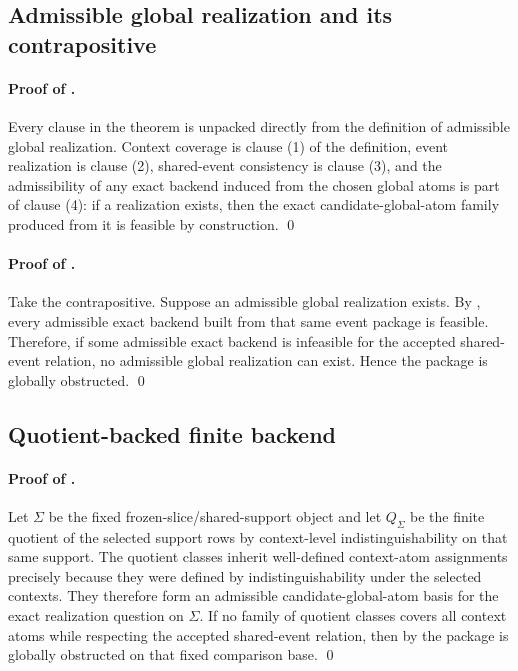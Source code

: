 \documentclass[11pt]{article}
\theoremstyle{definition}
\begin{document}
\subsection{Admissible global realization and its contrapositive}

\paragraph{Proof of .}
Every clause in the theorem is unpacked directly from the definition of admissible global realization. Context coverage is clause (1) of the definition, event realization is clause (2), shared-event consistency is clause (3), and the admissibility of any exact backend induced from the chosen global atoms is part of clause (4): if a realization exists, then the exact candidate-global-atom family produced from it is feasible by construction. \qed

\paragraph{Proof of .}
Take the contrapositive. Suppose an admissible global realization exists. By , every admissible exact backend built from that same event package is feasible. Therefore, if some admissible exact backend is infeasible for the accepted shared-event relation, no admissible global realization can exist. Hence the package is globally obstructed. \qed

\subsection{Quotient-backed finite backend}

\paragraph{Proof of .}
Let \(\Sigma\) be the fixed frozen-slice/shared-support object and let \(Q_\Sigma\) be the finite quotient of the selected support rows by context-level indistinguishability on that same support. The quotient classes inherit well-defined context-atom assignments precisely because they were defined by indistinguishability under the selected contexts. They therefore form an admissible candidate-global-atom basis for the exact realization question on \(\Sigma\). If no family of quotient classes covers all context atoms while respecting the accepted shared-event relation, then by  the package is globally obstructed on that fixed comparison base. \qed
\end{document}
